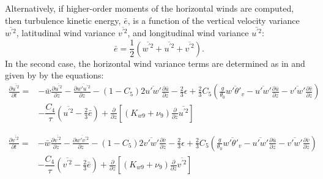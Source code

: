 \documentclass[11pt,fleqn]{article}
\newcommand{\ptlder}[2]{\frac{\partial #1}{\partial #2}}
\begin{document}
Alternatively, if higher-order moments of the horizontal winds are computed, 
then turbulence kinetic energy, $\bar{e}$, is a function of the vertical 
velocity variance $\overline{w^{'2}}$, 
latitudinal wind variance $\overline{v^{'2}}$, and 
longitudinal wind variance $\overline{u^{'2}}$:
%
\begin{equation}
\label{eq_aniso_tke}
\bar{e} = \frac{1}{2} 
  \left( 
    \overline{w^{'2}}+\overline{u^{'2}}+\overline{v^{'2}}
  \right).
\end{equation}
%
In the second case, the horizontal wind variance terms are determined as in 
\citet{bougeault1981a} and given by by the equations:
%
\begin{equation}
\begin{split}
\label{eq_up2}
\ptlder{\overline{u^{'2}}}{t}
= & - \bar{w}\ptlder{\overline{u^{'2}}}{z}	  
    - \ptlder{\overline{w'u^{'2}}}{z}
    - \left(1 - C_{5} \right) 2\overline{u'w'}\ptlder{\bar{u}}{z} 
    - \frac{2}{3} \epsilon 
    + \frac{2}{3} C_{5}
      \left(
        \frac{g}{\theta_0} \overline{w'\theta'_v} 
        - \overline{u'w'}\ptlder{\bar{u}}{z} 
        - \overline{v'w'}\ptlder{\bar{v}}{z} 
      \right) \\
  & - \dfrac{C_4}{\tau} \left( \overline{u^{'2}} - \frac{2}{3} \bar{e} \right)
    + \ptlder{}{z} \left[ \left( K_{w9} + \nu_9 \right)
                          \ptlder{}{z} \overline{u^{'2}} 
                   \right]
\end{split}
\end{equation}
%

%
\begin{equation}
\begin{split}
\label{eq_vp2}
\ptlder{\overline{v^{'2}}}{t}
= & - \bar{w}\ptlder{\overline{v^{'2}}}{z}	  
    - \ptlder{\overline{w'v^{'2}}}{z}
    - \left(1 - C_{5} \right) 2\overline{v'w'}\ptlder{\bar{v}}{z} 
    - \frac{2}{3} \epsilon 
    + \frac{2}{3} C_{5}
      \left(
        \frac{g}{\theta_0} \overline{w'\theta'_v}
        - \overline{u'w'}\ptlder{\bar{u}}{z} 
        - \overline{v'w'}\ptlder{\bar{v}}{z} 
      \right) \\
  & - \dfrac{C_4}{\tau} \left( \overline{v^{'2}} - \frac{2}{3} \bar{e} \right)
    + \ptlder{}{z} \left[ \left( K_{w9} + \nu_9 \right)
                          \ptlder{}{z} \overline{v^{'2}} 
                   \right]
\end{split}
\end{equation}
%
\end{document}
